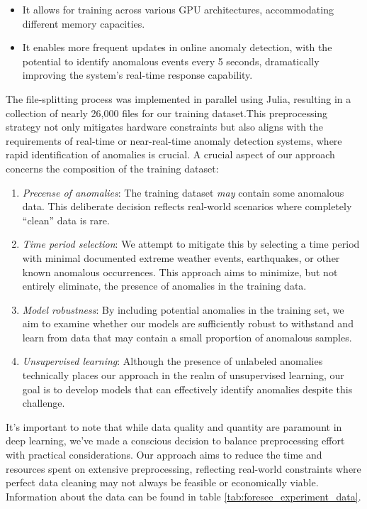 \begin{itemize}
    \item It allows for training across various GPU architectures, accommodating different memory capacities.
    \item It enables more frequent updates in online anomaly detection, with the potential to identify anomalous events every 5 seconds, dramatically improving the system's real-time response capability.
\end{itemize}


The file-splitting process was implemented in parallel using Julia, resulting in a collection of nearly 26,000 files for our training dataset.This preprocessing strategy not only mitigates hardware constraints but also aligns with the requirements of real-time or near-real-time anomaly detection systems, where rapid identification of anomalies is crucial. A crucial aspect of our approach concerns the composition of the training dataset:

\begin{enumerate}
    \item \textit{Precense of anomalies}: The training dataset \textit{may} contain some anomalous data. This deliberate decision reflects real-world scenarios where completely ``clean'' data is rare.
    \item \textit{Time period selection}: We attempt to mitigate this by selecting a time period with minimal documented extreme weather events, earthquakes, or other known anomalous occurrences. This approach aims to minimize, but not entirely eliminate, the presence of anomalies in the training data.
    \item \textit{Model robustness}: By including potential anomalies in the training set, we aim to examine whether our models are sufficiently robust to withstand and learn from data that may contain a small proportion of anomalous samples.
    \item \textit{Unsupervised learning}: Although the presence of unlabeled anomalies technically places our approach in the realm of unsupervised learning, our goal is to develop models that can effectively identify anomalies despite this challenge.
\end{enumerate}

It's important to note that while data quality and quantity are paramount in deep learning, we've made a conscious decision to balance preprocessing effort with practical considerations. Our approach aims to reduce the time and resources spent on extensive preprocessing, reflecting real-world constraints where perfect data cleaning may not always be feasible or economically viable. Information about the data can be found in table \ref{tab:foresee_experiment_data}. \\

